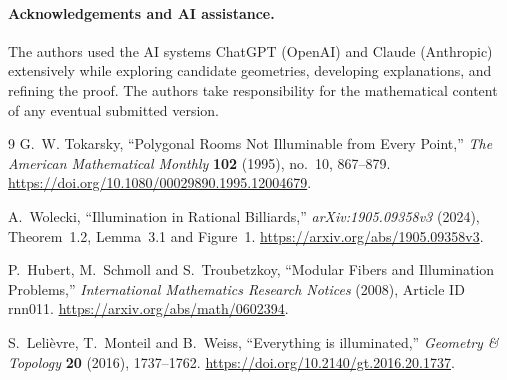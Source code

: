 \documentclass[11pt]{article}
\theoremstyle{remark}
\begin{document}
\paragraph{Acknowledgements and AI assistance.}
The authors used the AI systems ChatGPT (OpenAI) and Claude (Anthropic) extensively while exploring candidate geometries, developing explanations, and refining the proof. The authors take responsibility for the mathematical content of any eventual submitted version.

\begin{thebibliography}{9}
G.~W. Tokarsky, ``Polygonal Rooms Not Illuminable from Every Point,''
\emph{The American Mathematical Monthly} \textbf{102} (1995), no.~10, 867--879.
\url{https://doi.org/10.1080/00029890.1995.12004679}.

A.~Wolecki, ``Illumination in Rational Billiards,''
\emph{arXiv:1905.09358v3} (2024), Theorem~1.2, Lemma~3.1 and Figure~1.
\url{https://arxiv.org/abs/1905.09358v3}.

P.~Hubert, M.~Schmoll and S.~Troubetzkoy,
``Modular Fibers and Illumination Problems,''
\emph{International Mathematics Research Notices} (2008), Article ID rnn011.
\url{https://arxiv.org/abs/math/0602394}.

S.~Leli\`evre, T.~Monteil and B.~Weiss,
``Everything is illuminated,''
\emph{Geometry \& Topology} \textbf{20} (2016), 1737--1762.
\url{https://doi.org/10.2140/gt.2016.20.1737}.
\end{thebibliography}
\end{document}
